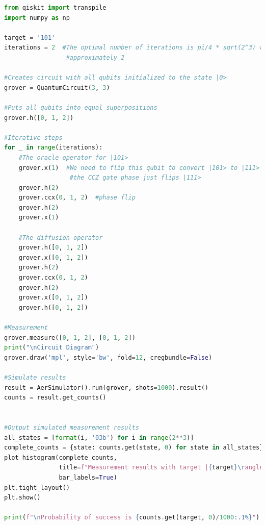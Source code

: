 \begin{lstlisting}[language=Python, caption={3 Qubit Grover search for the state $|101\rangle$}]
from qiskit import transpile
import numpy as np

target = '101'
iterations = 2  #The optimal number of iterations is pi/4 * sqrt(2^3) which is 
                 #approximately 2

#Creates circuit with all qubits initialized to the state |0>
grover = QuantumCircuit(3, 3)

#Puts all qubits into equal superpositions
grover.h([0, 1, 2])

#Iterative steps
for _ in range(iterations):
    #The oracle operator for |101>
    grover.x(1)  #We need to flip this qubit to convert |101> to |111> as 
                  #the CCZ gate phase just flips |111>
    grover.h(2)
    grover.ccx(0, 1, 2)  #phase flip
    grover.h(2)
    grover.x(1)
    
    #The diffusion operator
    grover.h([0, 1, 2])
    grover.x([0, 1, 2])
    grover.h(2)
    grover.ccx(0, 1, 2)
    grover.h(2)
    grover.x([0, 1, 2])
    grover.h([0, 1, 2])

#Measurement
grover.measure([0, 1, 2], [0, 1, 2])
print("\nCircuit Diagram")
grover.draw('mpl', style='bw', fold=12, cregbundle=False)

#Simulate results
result = AerSimulator().run(grover, shots=1000).result()
counts = result.get_counts()


#Output simulated measurement results
all_states = [format(i, '03b') for i in range(2**3)]
complete_counts = {state: counts.get(state, 0) for state in all_states}
plot_histogram(complete_counts,
               title=f"Measurement results with target |{target}\rangle",
               bar_labels=True)
plt.tight_layout()
plt.show()

print(f"\nProbability of success is {counts.get(target, 0)/1000:.1%}")

\end{lstlisting}


